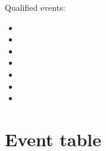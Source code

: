 Qualified events:
\begin{itemize} 
	\item 
	\item
	\item
	\item
	\item
	\item
	\item

\end{itemize}

\section{Event table}

